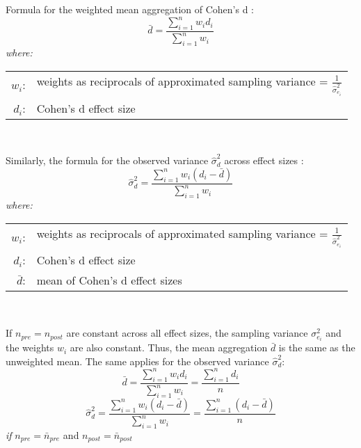 \par Formula for the weighted mean aggregation of Cohen's d \parencite{borenstein2021introduction, hedges1985statistical, morris2002combining}:
\begin{equation} \label{eq:mean_weighted}
    \bar{d} = \frac{\sum_{i=1}^{n} w_{i} d_{i}}{\sum_{i=1}^{n} w_{i}}
\end{equation}
\hspace{0.5cm} \textit{where:} \\
\hspace*{3em}
\begin{tabular}{rl}
    $w_{i}$:& weights as reciprocals of approximated sampling variance = $\frac{1}{\hat{\sigma}^2_{e_{i}}}$ \\
    $d_{i}$:& Cohen's d effect size \\
\end{tabular} \\

\par Similarly, the formula for the observed variance $\hat{\sigma}^2_{d}$ across effect sizes \parencite{morris2002combining}:
\begin{equation} \label{eq:variance_observed}
    \hat{\sigma}^2_{d} = \frac{\sum_{i=1}^{n} w_{i} (d_{i}-\bar{d})}{\sum_{i=1}^{n} w_{i}}
\end{equation}
\hspace{0.5cm} \textit{where:} \\
\hspace*{3em}
\begin{tabular}{rl}
    $w_{i}$:& weights as reciprocals of approximated sampling variance = $\frac{1}{\hat{\sigma}^2_{e_{i}}}$ \\
    $d_{i}$:& Cohen's d effect size \\
    $\bar{d}$:& mean of Cohen's d effect sizes \\
\end{tabular} \\

\newpage
\par If $n_{pre} = n_{post}$ are constant across all effect sizes, the sampling variance $\sigma^2_{e_{i}}$ and the weights $w_{i}$ are also constant. Thus, the mean aggregation $\bar{d}$ is the same as the unweighted mean. The same applies for the observed variance $\hat{\sigma}^2_{d}$:
\begin{equation} \label{eq:mean_unweighted}
    \bar{d} = \frac{\sum_{i=1}^{n} w_{i} d_{i}}{\sum_{i=1}^{n} w_{i}} = \frac{\sum_{i=1}^{n} d_{i}}{n}
\end{equation}
\begin{equation} \label{eq:variance_observed_unweighted}
    \hat{\sigma}^2_{d} = \frac{\sum_{i=1}^{n} w_{i} (d_{i}-\bar{d})}{\sum_{i=1}^{n} w_{i}} = \frac{\sum_{i=1}^{n} (d_{i}-\bar{d})}{n}
\end{equation}
\hspace{0.5cm} \textit{if} $n_{pre} = \bar{n}_{pre}$ and $n_{post} = \bar{n}_{post}$


